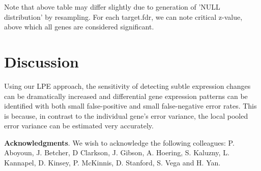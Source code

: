 \documentclass[12pt]{article}
\begin{document}
\noindent Note that above table may differ slightly due to generation 
of 'NULL distribution' by resampling. For each target.fdr, we can 
note critical z-value,
above which all genes are considered significant.

\section{Discussion}
\label{sec:discussion}
Using our LPE approach, the sensitivity of detecting subtle
expression changes can be dramatically increased and differential
gene expression patterns can be identified with both small
false-positive and small false-negative error rates. This is
because, in contrast to the individual gene's error variance, the
local pooled error variance can be estimated very accurately.
\vspace{0.25 in}

\textbf{Acknowledgments}. We wish to acknowledge the following
colleagues: P. Aboyoun, J. Betcher, D Clarkson, J. Gibson, A.
Hoering, S. Kaluzny, L. Kannapel, D. Kinsey, P. McKinnis,
D. Stanford, S. Vega and H. Yan.




\end{document}
